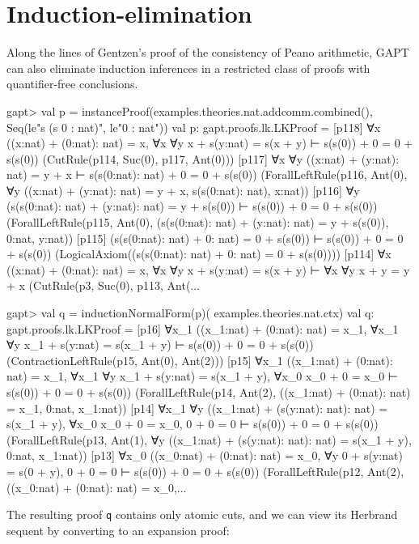 \documentclass[a4paper,11pt]{book}
\begin{document}
\section{Induction-elimination}

Along the lines of Gentzen's proof of the consistency of Peano arithmetic,
GAPT can also eliminate induction inferences in a restricted class of proofs
with quantifier-free conclusions.

\begin{clilisting}
gapt> val p = instanceProof(examples.theories.nat.addcomm.combined(),                                     Seq(le"s (s 0 : nat)", le"0 : nat"))
val p: gapt.proofs.lk.LKProof =
[p118] ∀x ((x:nat) + (0:nat): nat) = x,
∀x ∀y x + s(y:nat) = s(x + y)
⊢
s(s(0)) + 0 = 0 + s(s(0))    (CutRule(p114, Suc(0), p117, Ant(0)))
[p117] ∀x ∀y ((x:nat) + (y:nat): nat) = y + x ⊢ s(s(0:nat): nat) + 0 = 0 + s(s(0))    (ForallLeftRule(p116, Ant(0), ∀y ((x:nat) + (y:nat): nat) = y + x, s(s(0:nat): nat), x:nat))
[p116] ∀y (s(s(0:nat): nat) + (y:nat): nat) = y + s(s(0)) ⊢ s(s(0)) + 0 = 0 + s(s(0))    (ForallLeftRule(p115, Ant(0), (s(s(0:nat): nat) + (y:nat): nat) = y + s(s(0)), 0:nat, y:nat))
[p115] (s(s(0:nat): nat) + 0: nat) = 0 + s(s(0)) ⊢ s(s(0)) + 0 = 0 + s(s(0))    (LogicalAxiom((s(s(0:nat): nat) + 0: nat) = 0 + s(s(0))))
[p114] ∀x ((x:nat) + (0:nat): nat) = x,
∀x ∀y x + s(y:nat) = s(x + y)
⊢
∀x ∀y x + y = y + x    (CutRule(p3, Suc(0), p113, Ant(...

gapt> val q = inductionNormalForm(p)(                                         examples.theories.nat.ctx)
val q: gapt.proofs.lk.LKProof =
[p16] ∀x_1 ((x_1:nat) + (0:nat): nat) = x_1,
∀x_1 ∀y x_1 + s(y:nat) = s(x_1 + y)
⊢
s(s(0)) + 0 = 0 + s(s(0))    (ContractionLeftRule(p15, Ant(0), Ant(2)))
[p15] ∀x_1 ((x_1:nat) + (0:nat): nat) = x_1,
∀x_1 ∀y x_1 + s(y:nat) = s(x_1 + y),
∀x_0 x_0 + 0 = x_0
⊢
s(s(0)) + 0 = 0 + s(s(0))    (ForallLeftRule(p14, Ant(2), ((x_1:nat) + (0:nat): nat) = x_1, 0:nat, x_1:nat))
[p14] ∀x_1 ∀y ((x_1:nat) + (s(y:nat): nat): nat) = s(x_1 + y),
∀x_0 x_0 + 0 = x_0,
0 + 0 = 0
⊢
s(s(0)) + 0 = 0 + s(s(0))    (ForallLeftRule(p13, Ant(1), ∀y ((x_1:nat) + (s(y:nat): nat): nat) = s(x_1 + y), 0:nat, x_1:nat))
[p13] ∀x_0 ((x_0:nat) + (0:nat): nat) = x_0,
∀y 0 + s(y:nat) = s(0 + y),
0 + 0 = 0
⊢
s(s(0)) + 0 = 0 + s(s(0))    (ForallLeftRule(p12, Ant(2), ((x_0:nat) + (0:nat): nat) = x_0,...

\end{clilisting}

The resulting proof \texttt{q} contains only atomic cuts, and we can view its Herbrand
sequent by converting to an expansion proof:
\end{document}
